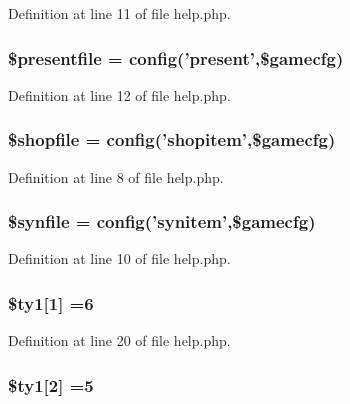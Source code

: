 Definition at line 11 of file help.\+php.

\hypertarget{help_8php_a9294d83ef6d001ede9b5e9dc96eb2a62}{
\subsubsection[{\$presentfile}]{\setlength{\rightskip}{0pt plus 5cm}\$presentfile = {\bf config}('present',\$gamecfg)}}\label{help_8php_a9294d83ef6d001ede9b5e9dc96eb2a62}


Definition at line 12 of file help.\+php.

\hypertarget{help_8php_afee43b66e7c378972cdfd311256e4bdc}{
\subsubsection[{\$shopfile}]{\setlength{\rightskip}{0pt plus 5cm}\$shopfile = {\bf config}('shopitem',\$gamecfg)}}\label{help_8php_afee43b66e7c378972cdfd311256e4bdc}


Definition at line 8 of file help.\+php.

\hypertarget{help_8php_a9d7789f6dc6b5b0f0b0886cddef59993}{
\subsubsection[{\$synfile}]{\setlength{\rightskip}{0pt plus 5cm}\$synfile = {\bf config}('synitem',\$gamecfg)}}\label{help_8php_a9d7789f6dc6b5b0f0b0886cddef59993}


Definition at line 10 of file help.\+php.

\hypertarget{help_8php_a69efb4615ba59410b71c65f9e9257768}{
\subsubsection[{\$ty1}]{\setlength{\rightskip}{0pt plus 5cm}\$ty1\mbox{[}1\mbox{]} =6}}\label{help_8php_a69efb4615ba59410b71c65f9e9257768}


Definition at line 20 of file help.\+php.

\hypertarget{help_8php_a1f878b8e6b252d143bca0b8db51dbc7a}{
\subsubsection[{\$ty1}]{\setlength{\rightskip}{0pt plus 5cm}\$ty1\mbox{[}2\mbox{]} =5}}\label{help_8php_a1f878b8e6b252d143bca0b8db51dbc7a}


